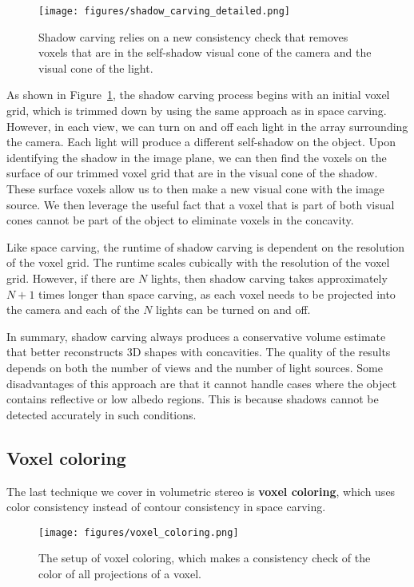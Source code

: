 \documentclass[a4paper, 12pt]{article}
\renewcommand\emph{\textbf}
\numberwithin{equation}{section}
\begin{document}
\begin{figure}[h!]
    \centering
    \texttt{[image: figures/shadow\_carving\_detailed.png]}
    \caption{Shadow carving relies on a new consistency check that removes voxels that are in the self-shadow visual cone of the camera and the visual cone of the light.}
    \label{fig:shadow_carving_detailed}
\end{figure}

As shown in Figure~\ref{fig:shadow_carving_detailed}, the shadow carving process begins with an initial voxel grid, which is trimmed down by using the same approach as in space carving. However, in each view, we can turn on and off each light in the array surrounding the camera. Each light will produce a different self-shadow on the object. Upon identifying the shadow in the image plane, we can then find the voxels on the surface of our trimmed voxel grid that are in the visual cone of the shadow. These surface voxels allow us to then make a new visual cone with the image source. We then leverage the useful fact that a voxel that is part of both visual cones cannot be part of the object to eliminate voxels in the concavity. 

Like space carving, the runtime of shadow carving is dependent on the resolution of the voxel grid. The runtime scales cubically with the resolution of the voxel grid. However, if there are $N$ lights, then shadow carving takes approximately $N+1$ times longer than space carving, as each voxel needs to be projected into the camera and each of the $N$ lights can be turned on and off.

In summary, shadow carving always produces a conservative volume estimate that better reconstructs 3D shapes with concavities. The quality of the results depends on both the number of views and the number of light sources. Some disadvantages of this approach are that it cannot handle cases where the object contains reflective or low albedo regions. This is because shadows cannot be detected accurately in such conditions.

\subsection{Voxel coloring}
The last technique we cover in volumetric stereo is \emph{voxel coloring}, which uses color consistency instead of contour consistency in space carving.

\begin{figure}[h!]
    \centering
    \texttt{[image: figures/voxel\_coloring.png]}
    \caption{The setup of voxel coloring, which makes a consistency check of the color of all projections of a voxel.}
    \label{fig:voxel_coloring}
\end{figure}
\end{document}
